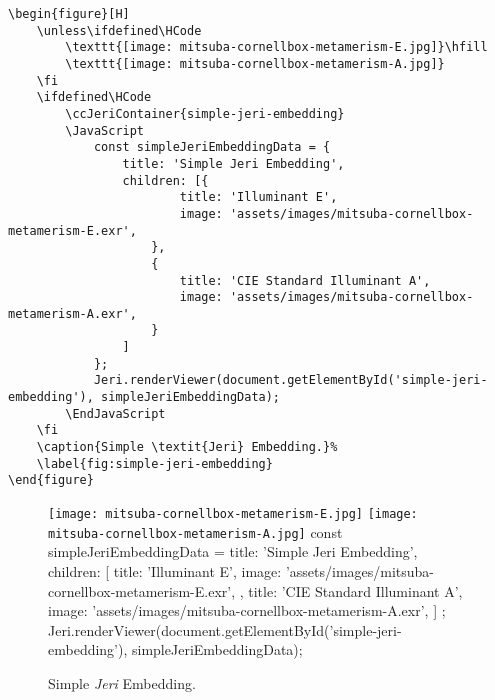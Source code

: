 \begin{lstlisting}[caption={Simple \textit{Jeri} Embedding.}]
\begin{figure}[H]
    \unless\ifdefined\HCode
        \texttt{[image: mitsuba-cornellbox-metamerism-E.jpg]}\hfill
        \texttt{[image: mitsuba-cornellbox-metamerism-A.jpg]}
    \fi
    \ifdefined\HCode
        \ccJeriContainer{simple-jeri-embedding}
        \JavaScript
            const simpleJeriEmbeddingData = {
                title: 'Simple Jeri Embedding',
                children: [{
                        title: 'Illuminant E',
                        image: 'assets/images/mitsuba-cornellbox-metamerism-E.exr',
                    },
                    {
                        title: 'CIE Standard Illuminant A',
                        image: 'assets/images/mitsuba-cornellbox-metamerism-A.exr',
                    }
                ]
            };
            Jeri.renderViewer(document.getElementById('simple-jeri-embedding'), simpleJeriEmbeddingData);
        \EndJavaScript
    \fi
    \caption{Simple \textit{Jeri} Embedding.}%
    \label{fig:simple-jeri-embedding}
\end{figure}
\end{lstlisting}

\begin{figure}[H]
    \unless\ifdefined\HCode
        \texttt{[image: mitsuba-cornellbox-metamerism-E.jpg]}\hfill
        \texttt{[image: mitsuba-cornellbox-metamerism-A.jpg]}
    \fi
    \ifdefined\HCode
        \JavaScript
            const simpleJeriEmbeddingData = {
                title: 'Simple Jeri Embedding',
                children: [{
                        title: 'Illuminant E',
                        image: 'assets/images/mitsuba-cornellbox-metamerism-E.exr',
                    },
                    {
                        title: 'CIE Standard Illuminant A',
                        image: 'assets/images/mitsuba-cornellbox-metamerism-A.exr',
                    }
                ]
            };
            Jeri.renderViewer(document.getElementById('simple-jeri-embedding'), simpleJeriEmbeddingData);
        \EndJavaScript
    \fi
    \caption{Simple \textit{Jeri} Embedding.}%
    \label{fig:simple-jeri-embedding}
\end{figure}

